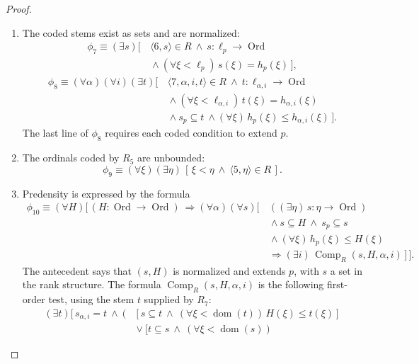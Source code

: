 \documentclass[10pt,a4paper]{amsart}
\theoremstyle{definition}
\theoremstyle{remark}
\DeclareMathOperator{\dom}{dom}
\DeclareMathOperator{\Ord}{Ord}
\DeclareMathOperator{\Comp}{Comp}
\begin{document}
\begin{proof}
\begin{enumerate}[label=\textup{(\alph*)}]
\(\ell_p,h_p(\xi),\ell_{\alpha,i},\delta_{\alpha,i}\),
and \(h_{\alpha,i}(\xi)\), respectively.
\item The coded stems exist as sets and are normalized:
\[
\begin{split}
 \phi_7\equiv (\exists s)\bigl[\,&\langle6,s\rangle\in R
       \ \land\ s:\ell_p\to\Ord\\
       &{}\land(\forall\xi<\ell_p)\,s(\xi)=h_p(\xi)\,\bigr],
\end{split}
\]
\[
\begin{split}
 \phi_8\equiv (\forall\alpha)(\forall i)(\exists t)\bigl[\,
       &\langle7,\alpha,i,t\rangle\in R
          \ \land\ t:\ell_{\alpha,i}\to\Ord\\
       &{}\land(\forall\xi<\ell_{\alpha,i})\,
                                 t(\xi)=h_{\alpha,i}(\xi)\\
       &{}\land s_p\subseteq t
          \ \land(\forall\xi)\,h_p(\xi)\leq h_{\alpha,i}(\xi)
       \,\bigr].
\end{split}
\]
The last line of \(\phi_8\) requires each coded condition
to extend \(p\).
\item The ordinals coded by \(R_5\) are unbounded:
\[
 \phi_9\equiv (\forall\xi)(\exists\eta)\,
       [\,\xi<\eta\ \land\ \langle5,\eta\rangle\in R\,].
\]
\item Predensity is expressed by the formula
\begin{equation*}\label{eq:predense}
\begin{split}
 \phi_{10}\equiv (\forall H)\bigl[\,(H:\Ord\to\Ord)\ \Longrightarrow
 (\forall\alpha)(\forall s)\bigl[\,
       &((\exists\eta)\,s:\eta\to\Ord)\\
       &{}\land s\subseteq H\ \land\ s_p\subseteq s\\
       &{}\land(\forall\xi)\,h_p(\xi)\leq H(\xi)\\
       &\Longrightarrow
               (\exists i)\,\Comp_R(s,H,\alpha,i)
       \,\bigr]\,\bigr].
\end{split}
\end{equation*}
The antecedent says that \((s,H)\) is normalized and extends
\(p\), with \(s\) a set in the rank structure.
The formula \(\Comp_R(s,H,\alpha,i)\) is the following
first-order test, using the stem \(t\) supplied by \(R_7\):
\[
\begin{split}
 (\exists t)\bigl[\,s_{\alpha,i}=t\ \land\
 \bigl(&[s\subseteq t\ \land\
             (\forall\xi<\dom(t))\,H(\xi)\leq t(\xi)]\\
 &{}\lor[t\subseteq s\ \land\
             (\forall\xi<\dom(s))\,

\end{split}\]
\end{enumerate}
\end{proof}
\end{document}
